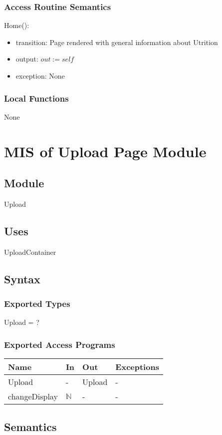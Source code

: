 \documentclass[12pt, titlepage]{article}
\begin{document}
\subsubsection{Access Routine Semantics}
\noindent Home():
\begin{itemize}
	\item transition: Page rendered with general information about Utrition
	\item output: $out := self$
	\item exception: None
\end{itemize}
\subsubsection{Local Functions}
None

\newpage

\section{MIS of Upload Page Module}
\subsection{Module}
Upload
\subsection{Uses}
UploadContainer
\subsection{Syntax}
\subsubsection{Exported Types}
Upload = ?
\subsubsection{Exported Access Programs}
\begin{center}
	\begin{tabular}{p{2cm} p{4cm} p{4cm} p{2cm}}
		\hline
		\textbf{Name} & \textbf{In} & \textbf{Out} & \textbf{Exceptions} \\
		\hline
		Upload & - & Upload & - \\
		changeDisplay & $\mathbb{N}$ & - & -\\
		\hline
	\end{tabular}
\end{center}
\subsection{Semantics}
\end{document}
